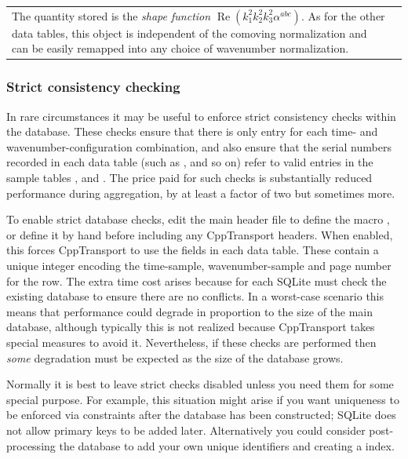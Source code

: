 \documentclass[11pt,a4paper]{article}
\renewcommand{\texttt}[1]{{\ttfamily\fontseries{l}\selectfont{#1}}}
\newcommand{\packagefont}{\sffamily}
\newcommand{\CppTransport}{{\packagefont CppTransport}}
\newcommand{\SQLite}{{\packagefont SQLite}}
\newcommand{\file}[1]{\texttt{{#1}}}
\newenvironment{sqltablelist}{\renewcommand{\arraystretch}{1.3}\small}{}
\DeclareMathOperator{\realpart}{Re}
\renewcommand{\Re}{\realpart}
\begin{document}
\begin{sqltablelist}
\begin{enumerate}
\begin{tabular}{p{2.5cm}p{11.2cm}}
        The quantity stored is the \emph{shape function}
        $\Re(k_1^2 k_2^2 k_3^2 \alpha^{abc})$.
        As for the other data tables, this object is independent of the
        comoving normalization and can be easily remapped into
        any choice of wavenumber normalization.
    \end{tabular}
\end{enumerate}    
\end{sqltablelist}

\subsubsection{Strict consistency checking}
\label{sec:strict-consistency}
In rare circumstances it may be useful to enforce strict consistency checks
within the database.
These checks ensure that there is only entry for each time- and wavenumber-configuration
combination,
and also ensure that the serial numbers
recorded in each data table
(such as \texttt{backg}, \texttt{twopf_re} and so on)
refer to valid entries in the sample tables
\texttt{time_samples},
\texttt{twopf_samples}
and
\texttt{threepf_samples}.
The price paid for such checks is substantially reduced
\texttt{INSERT} performance during aggregation, by at least a factor of
two but sometimes more.

To enable strict database checks, edit the main header file
\file{transport.h}
to define the macro
\texttt{CPPTRANSPORT_STRICT_CONSISTENCY}, or define it by hand
before including any {\CppTransport} headers.
When enabled, this forces {\CppTransport} to use the
\texttt{unique_id} fields in each data table.
These contain a unique integer encoding the
time-sample, wavenumber-sample and page number for the row.
The extra time cost arises because for each
\texttt{INSERT} {\SQLite} must check
the existing database to ensure there are no conflicts.
In a worst-case scenario
this means that \texttt{INSERT} performance could degrade
in proportion to the size of the main database, although typically
this is not realized because {\CppTransport} takes special measures to avoid it.
Nevertheless, if these checks are performed then
\emph{some} degradation must be expected as the size of the database
grows.

Normally it is best to leave strict checks disabled unless you need them for some special
purpose. For example, this situation might arise if
you want uniqueness to be enforced via
\texttt{PRIMARY KEY} constraints after the database has been constructed;
{\SQLite} does not allow primary keys to be added later.
Alternatively you could consider post-processing the database to add your
own unique identifiers and creating a
\texttt{UNIQUE} index.
\end{document}
